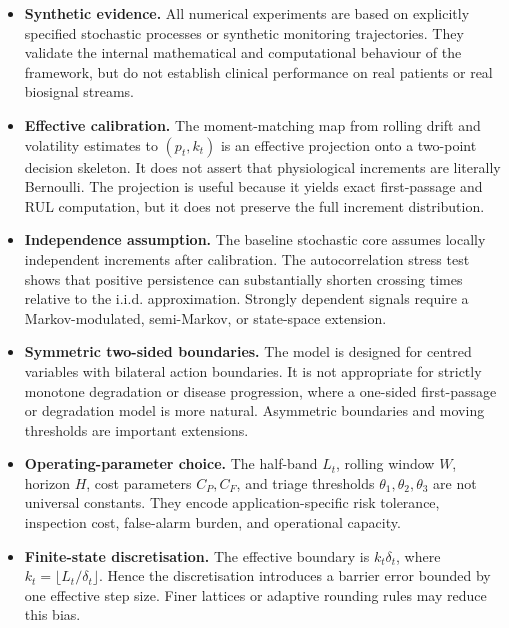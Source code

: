 \documentclass[pdflatex,sn-mathphys-num]{sn-jnl}
\theoremstyle{definition}
\numberwithin{equation}{section}
\begin{document}
\begin{itemize}
\item \textbf{Synthetic evidence.}
All numerical experiments are based on explicitly specified stochastic
processes or synthetic monitoring trajectories. They validate the internal
mathematical and computational behaviour of the framework, but do not establish
clinical performance on real patients or real biosignal streams.

\item \textbf{Effective calibration.}
The moment-matching map from rolling drift and volatility estimates to
\((p_t,k_t)\) is an effective projection onto a two-point decision skeleton. It
does not assert that physiological increments are literally Bernoulli. The
projection is useful because it yields exact first-passage and RUL computation,
but it does not preserve the full increment distribution.

\item \textbf{Independence assumption.}
The baseline stochastic core assumes locally independent increments after
calibration. The autocorrelation stress test shows that positive persistence
can substantially shorten crossing times relative to the i.i.d. approximation.
Strongly dependent signals require a Markov-modulated, semi-Markov, or
state-space extension.

\item \textbf{Symmetric two-sided boundaries.}
The model is designed for centred variables with bilateral action boundaries.
It is not appropriate for strictly monotone degradation or disease progression,
where a one-sided first-passage or degradation model is more natural.
Asymmetric boundaries and moving thresholds are important extensions.

\item \textbf{Operating-parameter choice.}
The half-band \(L_t\), rolling window \(W\), horizon \(H\), cost parameters
\(C_P,C_F\), and triage thresholds \(\theta_1,\theta_2,\theta_3\) are not
universal constants. They encode application-specific risk tolerance,
inspection cost, false-alarm burden, and operational capacity.

\item \textbf{Finite-state discretisation.}
The effective boundary is \(k_t\delta_t\), where
\(k_t=\lfloor L_t/\delta_t\rfloor\). Hence the discretisation introduces a
barrier error bounded by one effective step size. Finer lattices or adaptive
rounding rules may reduce this bias.
\end{itemize}
\end{document}
